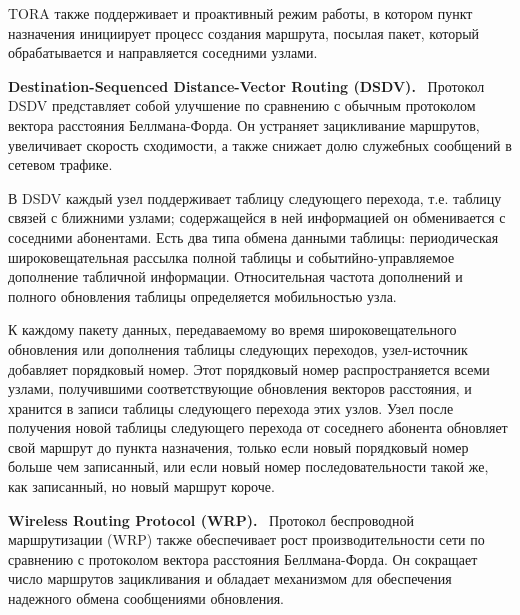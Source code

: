 \documentclass[14pt,a4paper,titlepage]{extarticle}
\renewcommand{\paragraph}[1]{\textbf{#1.}~}
\begin{document}
TORA также поддерживает и проактивный режим работы, в котором пункт назначения инициирует процесс создания маршрута, посылая пакет, который обрабатывается и направляется соседними узлами.

\paragraph{Destination-Sequenced Distance-Vector Routing (DSDV)}
Протокол DSDV представляет собой улучшение по сравнению с обычным протоколом вектора расстояния Беллмана-Форда. Он устраняет зацикливание маршрутов, увеличивает скорость сходимости, а также снижает долю служебных сообщений в сетевом трафике.

В DSDV каждый узел поддерживает таблицу следующего перехода, т.е. таблицу связей с ближними узлами; содержащейся в ней информацией он обменивается с соседними абонентами. Есть два типа обмена данными таблицы: периодическая широковещательная рассылка полной таблицы и событийно-управляемое дополнение табличной информации. Относительная частота дополнений и полного обновления таблицы определяется мобильностью узла. 

К каждому пакету данных, передаваемому во время широковещательного обновления или дополнения таблицы следующих переходов, узел-источник добавляет порядковый номер. Этот порядковый номер распространяется всеми узлами, получившими соответствующие обновления векторов расстояния, и хранится в записи таблицы следующего перехода этих узлов. Узел после получения новой таблицы следующего перехода от соседнего абонента обновляет свой маршрут до пункта назначения, только если новый порядковый номер больше чем записанный, или если новый номер последовательности такой же, как записанный, но новый маршрут короче. 

\paragraph{Wireless Routing Protocol (WRP)}
Протокол беспроводной маршрутизации (WRP) также обеспечивает рост производительности сети по сравнению с протоколом вектора расстояния Беллмана-Форда. Он сокращает число маршрутов зацикливания и обладает механизмом для обеспечения надежного обмена сообщениями обновления.

\end{document}
